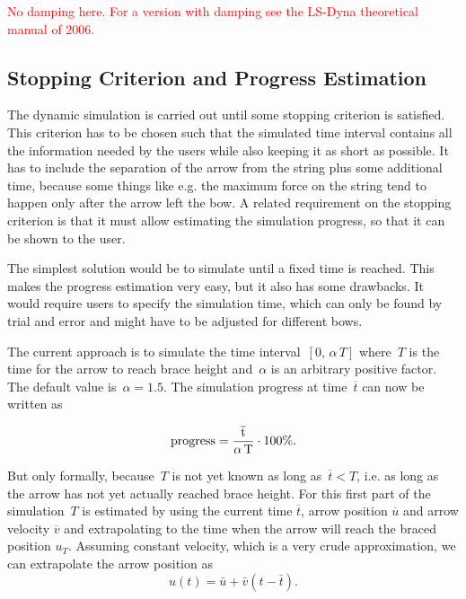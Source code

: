 \textcolor{red}{No damping here. For a version with damping see the LS-Dyna theoretical manual of 2006.}

\subsection{Stopping Criterion and Progress Estimation}

The dynamic simulation is carried out until some stopping criterion is satisfied.
This criterion has to be chosen such that the simulated time interval contains all the information needed by the users while also keeping it as short as possible.
It has to include the separation of the arrow from the string plus some additional time, because some things like e.g. the maximum force on the string tend to happen only after the arrow left the bow.
A related requirement on the stopping criterion is that it must allow estimating the simulation progress, so that it can be shown to the user.

The simplest solution would be to simulate until a fixed time is reached.
This makes the progress estimation very easy, but it also has some drawbacks.
It would require users to specify the simulation time, which can only be found by trial and error and might have to be adjusted for different bows.

The current approach is to simulate the time interval~$[0,\,\alpha\,T]$ where~$T$ is the time for the arrow to reach brace height and~$\alpha$ is an arbitrary positive factor.
The default value is~$\alpha = 1.5$. The simulation progress at time~$\overline{t}$ can now be written as

\begin{equation}
\rm{progress} = \frac{\overline{t}}{\alpha\,T}\cdot 100\%.
\end{equation}

But only formally, because~$T$ is not yet known as long as~$\overline{t} < T$, i.e. as long as the arrow has not yet actually reached brace height.
For this first part of the simulation~$T$ is estimated by using the current time $\overline{t}$, arrow position $\overline{u}$ and arrow velocity $\overline{v}$ and extrapolating to the time when the arrow will reach the braced position $u_T$.
Assuming constant velocity, which is a very crude approximation, we can extrapolate the arrow position as
\begin{equation}
u(t) = \bar{u} + \bar{v}(t - \bar{t}).\label{eq:solution:progress:ansatz}
\end{equation}

